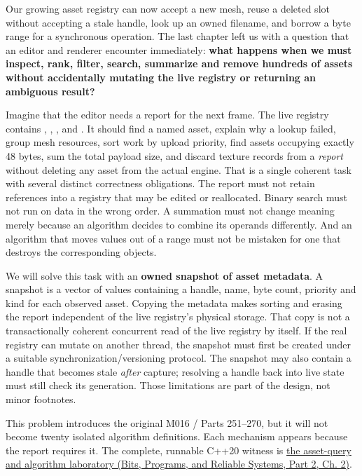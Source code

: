 \hypertarget{01-foundations-i-ch006-from-a-living-asset-registry-to-reliable-queries-and-transformations}{}

Our growing asset registry can now accept a new mesh, reuse a deleted slot without accepting a stale handle, look up an owned filename, and borrow a byte range for a synchronous operation. The last chapter left us with a question that an editor and renderer encounter immediately: \textbf{what happens when we must inspect, rank, filter, search, summarize and remove hundreds of assets without accidentally mutating the live registry or returning an ambiguous result?}

Imagine that the editor needs a report for the next frame. The live registry contains , , ,  and . It should find a named asset, explain why a lookup failed, group mesh resources, sort work by upload priority, find assets occupying exactly 48 bytes, sum the total payload size, and discard texture records from a \emph{report} without deleting any asset from the actual engine. That is a single coherent task with several distinct correctness obligations. The report must not retain references into a registry that may be edited or reallocated. Binary search must not run on data in the wrong order. A summation must not change meaning merely because an algorithm decides to combine its operands differently. And an algorithm that moves values out of a range must not be mistaken for one that destroys the corresponding objects.

We will solve this task with an \textbf{owned snapshot of asset metadata}. A snapshot is a vector of values containing a handle, name, byte count, priority and kind for each observed asset. Copying the metadata makes sorting and erasing the report independent of the live registry's physical storage. That copy is not a transactionally coherent concurrent read of the live registry by itself. If the real registry can mutate on another thread, the snapshot must first be created under a suitable synchronization/versioning protocol. The snapshot may also contain a handle that becomes stale \emph{after} capture; resolving a handle back into live state must still check its generation. Those limitations are part of the design, not minor footnotes.

This problem introduces the original M016 / Parts 251--270, but it will not become twenty isolated algorithm definitions. Each mechanism appears because the report requires it. The complete, runnable C++20 witness is \href{../01-Bits-Programs-and-Reliable-Systems-P02/main.pdf\#source-file-c479bd493444d093f6c34898}{the asset-query and algorithm laboratory (Bits, Programs, and Reliable Systems, Part 2, Ch. 2)}.


